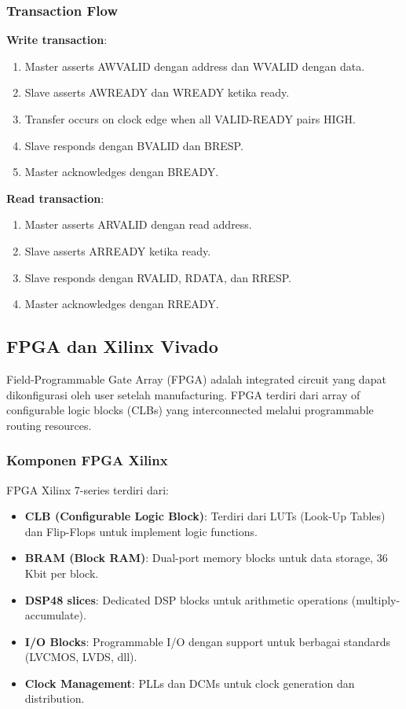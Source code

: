 \subsubsection{Transaction Flow}

\textbf{Write transaction}:
\begin{enumerate}
	\item Master asserts AWVALID dengan address dan WVALID dengan data.
	\item Slave asserts AWREADY dan WREADY ketika ready.
	\item Transfer occurs on clock edge when all VALID-READY pairs HIGH.
	\item Slave responds dengan BVALID dan BRESP.
	\item Master acknowledges dengan BREADY.
\end{enumerate}

\textbf{Read transaction}:
\begin{enumerate}
	\item Master asserts ARVALID dengan read address.
	\item Slave asserts ARREADY ketika ready.
	\item Slave responds dengan RVALID, RDATA, dan RRESP.
	\item Master acknowledges dengan RREADY.
\end{enumerate}

\subsection{FPGA dan Xilinx Vivado}

Field-Programmable Gate Array (FPGA) adalah integrated circuit yang dapat dikonfigurasi oleh user setelah manufacturing. FPGA terdiri dari array of configurable logic blocks (CLBs) yang interconnected melalui programmable routing resources.

\subsubsection{Komponen FPGA Xilinx}

FPGA Xilinx 7-series terdiri dari:
\begin{itemize}
	\item \textbf{CLB (Configurable Logic Block)}: Terdiri dari LUTs (Look-Up Tables) dan Flip-Flops untuk implement logic functions.
	\item \textbf{BRAM (Block RAM)}: Dual-port memory blocks untuk data storage, 36 Kbit per block.
	\item \textbf{DSP48 slices}: Dedicated DSP blocks untuk arithmetic operations (multiply-accumulate).
	\item \textbf{I/O Blocks}: Programmable I/O dengan support untuk berbagai standards (LVCMOS, LVDS, dll).
	\item \textbf{Clock Management}: PLLs dan DCMs untuk clock generation dan distribution.
\end{itemize}

